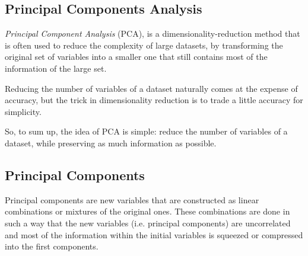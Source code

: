 \begin{enumerate}
%


\section{Principal Components Analysis}
\label{sec:pca}

\emph{Principal Component Analysis} (PCA), is a dimensionality-reduction method that is often used to reduce the complexity of large datasets, by transforming the original set of variables into a smaller one that still contains most of the information of the large set.

Reducing the number of variables of a dataset naturally comes at the expense of accuracy, but the trick in dimensionality reduction is to trade a little accuracy for simplicity. 

So, to sum up, the idea of PCA is simple: reduce the number of variables of a dataset, while preserving as much information as possible.

\subsection{Principal Components}

Principal components are new variables that are constructed as linear combinations or mixtures of the original ones. These combinations are done in such a way that the new variables (i.e. principal components) are uncorrelated and most of the information within the initial variables is squeezed or compressed into the first components. 


\end{enumerate}
